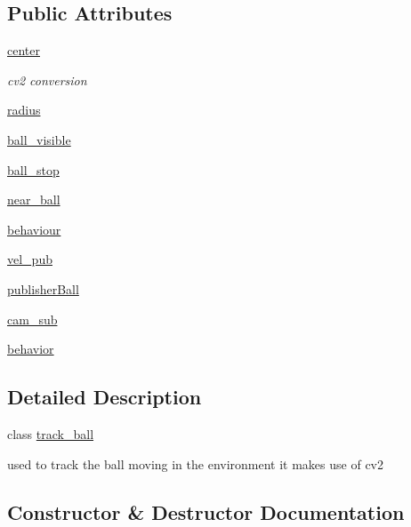 \subsection*{Public Attributes}
\begin{DoxyCompactItemize}
\item 
\hyperlink{classopencv__tracking_1_1track__ball_a92050fb578b1e2e7bea37b0abdbf26aa}{center}
\begin{DoxyCompactList}\small\item\em cv2 conversion \end{DoxyCompactList}\item 
\hyperlink{classopencv__tracking_1_1track__ball_ae497b649948b1e33fb3cc71b01646da3}{radius}
\item 
\hyperlink{classopencv__tracking_1_1track__ball_a2fd263ce72f097474d63022a51a1aff9}{ball\+\_\+visible}
\item 
\hyperlink{classopencv__tracking_1_1track__ball_a0cef778dc02f2169211f2e756d94db7b}{ball\+\_\+stop}
\item 
\hyperlink{classopencv__tracking_1_1track__ball_a38f20351ab0571002f7552aed7bb6979}{near\+\_\+ball}
\item 
\hyperlink{classopencv__tracking_1_1track__ball_ace82efcb5e44b826ac65d61642b447a8}{behaviour}
\item 
\hyperlink{classopencv__tracking_1_1track__ball_a09ab81e992a70d22568ed1f6c556d1bb}{vel\+\_\+pub}
\item 
\hyperlink{classopencv__tracking_1_1track__ball_ad351c91525368a89ff0a7bb1d257b3d1}{publisher\+Ball}
\item 
\hyperlink{classopencv__tracking_1_1track__ball_aaefd39e73e7ee6f26d43bd19d6eaedaf}{cam\+\_\+sub}
\item 
\hyperlink{classopencv__tracking_1_1track__ball_aab7a7dae7030c9b39e7bfc1d892b5720}{behavior}
\end{DoxyCompactItemize}


\subsection{Detailed Description}
class \hyperlink{classopencv__tracking_1_1track__ball}{track\+\_\+ball} 

used to track the ball moving in the environment it makes use of cv2 

\subsection{Constructor \& Destructor Documentation}
